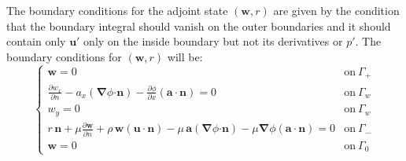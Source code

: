 \documentclass[12pt, a4paper]{article}
\begin{document}
    The boundary conditions for the adjoint state $(\mathbf{w}, r)$ are given by the condition that the boundary integral should vanish on the outer boundaries and it should contain only $\mathbf{u'}$ only on the inside boundary but not its derivatives or $p'$. The boundary conditions for $(\mathbf{w}, r)$ will be:
    \begin{equation}
    \begin{cases}
        \mathbf{w} = 0	 	&	\text{on}\ \Gamma_+ \\
        \frac{\partial w_x}{\partial n} - a_x (\boldsymbol{\nabla} \phi \mathbf{\cdot n}) - 
        \frac{\partial \phi}{\partial x} (\mathbf{a \cdot n}) = 0	&	\text{on}\ \Gamma_w \\
        w_y = 0				&	\text{on}\ \Gamma_w \\
        r \, \mathbf{n} + \mu \frac{\partial \mathbf{w}}{\partial n} + \rho \, \mathbf{w} (\mathbf{u \cdot n}) - 
        \mu \, \mathbf{a} (\boldsymbol{\nabla} \phi \mathbf{\cdot n}) - 
        \mu \boldsymbol{\nabla} \phi (\mathbf{a \cdot n}) = 0	   	&	\text{on}\ \Gamma_- \\
        \mathbf{w} = 0	 	&	\text{on}\ \Gamma_0
    \end{cases}
    \end{equation}
    
\end{document}
